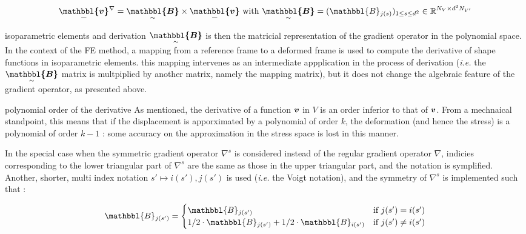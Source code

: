 \documentclass[fleqn]{article}
\begin{document}
        \begin{equation*}
          \tensori{\mathbbl{v}}\supscript{\nabla}
          =
          \tensorii{\mathbbl{B}}
          \times
          \tensori{\mathbbl{v}}
          \mbox{ with }
          \tensorii{\mathbbl{B}} = (\mathbbl{B}\subscript{j(s)})\subscript{1 \leq s \leq d^2} \in \mathbb{R}^{N_V \times d^2 N_{V'}}
        \end{equation*}

        \begin{infobox}{isoparametric elements and derivation}
          $\tensorii{\mathbbl{B}}$ is then the matricial representation of the gradient operator in the polynomial space.
          In the context of the FE method, a mapping from a reference frame to a deformed frame is used to compute the derivative of shape functions in isoparametric elements. this mapping intervenes as an intermediate appplication in the process of derivation (\textit{i.e.} the $\tensorii{\mathbbl{B}}$ matrix is multpiplied by another matrix, namely the mapping matrix), but it does not change the algebraic feature of the gradient operator, as presented above.
        \end{infobox}

        \begin{infobox}{polynomial order of the derivative}
          As mentioned, the derivative of a function $\bm{v}$ in $V$ is an order inferior to that of $\bm{v}$. From a mechnaical standpoint, this means that if the displacement is apporximated by a polynomial of order $k$, the deformation (and hence the stress) is a polynomial of order $k-1$ : some accuracy on the approximation in the stress space is lost in this manner.
        \end{infobox}

        In the special case when the symmetric gradient operator $\nabla^s$ is considered instead of the regular gradient operator $\nabla$, indicies corresponding to the lower triangular part of $\nabla^s$ are the same as those in the upper triangular part, and the notation is symplified.
        \newline
        Another, shorter, multi index notation $s' \mapsto i(s'), j(s')$ is used (\textit{i.e.} the Voigt notation), and the symmetry of $\nabla^s$ is implemented such that :

        \begin{equation*}
          \mathbbl{B}\subscript{j(s')} = 
          \begin{cases}
            \mathbbl{B}\subscript{j(s')} & \mbox{if } j(s') = i(s')
            \\
            1/2 \cdot \mathbbl{B}\subscript{j(s')} + 1/2 \cdot \mathbbl{B}\subscript{i(s')} & \mbox{if } j(s') \neq i(s')
          \end{cases}
        \end{equation*}
\end{document}
